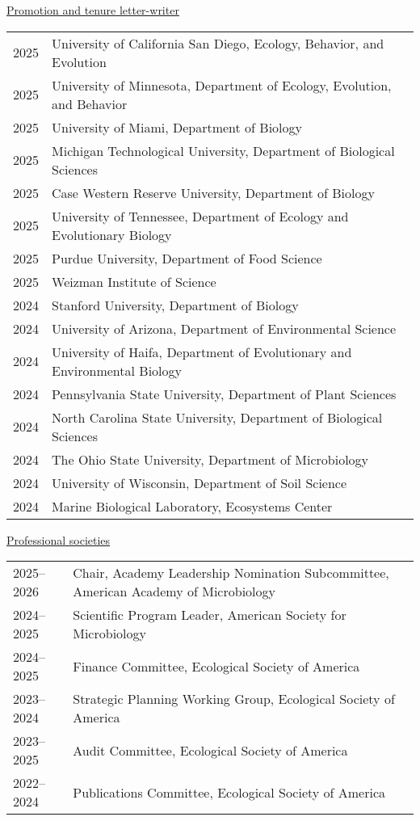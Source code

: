 \documentclass[11pt]{article}
\begin{document}
\vspace{-1em}
\textnormal{\underline{Promotion and tenure letter-writer}}\\[-2.5em]
\begin{longtable}{@{}p{4em}@{\hspace{2em}}p{}@{}}
2025 & University of California San Diego,  Ecology, Behavior, and Evolution \\
2025 & University of Minnesota, Department of Ecology, Evolution, and Behavior \\
2025 & University of Miami, Department of Biology \\
2025 & Michigan Technological University, Department of Biological Sciences\\
2025 & Case Western Reserve University, Department of Biology \\
2025 & University of Tennessee, Department of Ecology and Evolutionary Biology \\
2025 & Purdue University, Department of Food Science \\
2025 & Weizman Institute of Science \\
2024 & Stanford University, Department of Biology \\
2024 & University of Arizona, Department of Environmental Science \\
2024 & University of Haifa, Department of Evolutionary and Environmental Biology \\
2024 & Pennsylvania State University, Department of Plant Sciences \\
2024 & North Carolina State University, Department of Biological Sciences \\
2024 & The Ohio State University, Department of Microbiology \\
2024 & University of Wisconsin, Department of Soil Science \\
2024 & Marine Biological Laboratory, Ecosystems Center \\
\end{longtable}

\vspace{-1em}
\textnormal{\underline{Professional societies}} \\[-2.5em]
\begin{longtable}{@{}p{4.5em}@{\hspace{3.5em}}p{}@{}}
2025--2026 & Chair, Academy Leadership Nomination Subcommittee, American Academy of Microbiology \\
2024--2025 & Scientific Program Leader, American Society for Microbiology \\
2024--2025 & Finance Committee, Ecological Society of America \\
2023--2024 & Strategic Planning Working Group, Ecological Society of America \\
2023--2025 & Audit Committee, Ecological Society of America \\
2022--2024 & Publications Committee, Ecological Society of America \\
\end{longtable}
\end{document}

